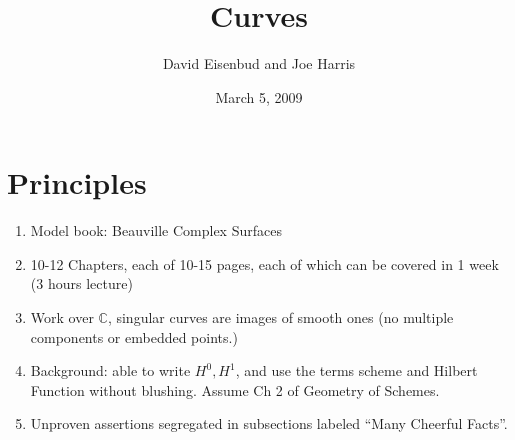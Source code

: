 \documentclass[12pt, leqno]{article}
\date{March 5, 2009}
\title{Curves}
\author{David Eisenbud and Joe Harris }
\def\CC{{\mathbb C}}
\begin{document}
\maketitle


\section*{Principles}
\begin{enumerate}

\item Model book: Beauville Complex Surfaces

\item 10-12 Chapters, each of 10-15 pages, each of which can be covered in 1 week (3 hours lecture)

\item Work over $\CC$, singular curves are images of smooth ones (no multiple components or embedded points.)

\item Background: able to write $H^0, H^1$, and use the terms scheme and Hilbert Function  without blushing. Assume Ch 2 of Geometry of Schemes.

\item Unproven assertions segregated in subsections labeled ``Many Cheerful Facts''.
\end{enumerate}
\end{document}
